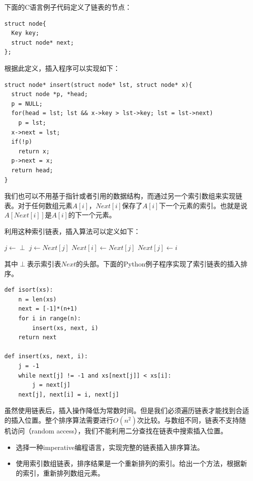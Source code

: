 \documentclass[UTF8]{article}
\begin{document}
下面的C语言例子代码定义了链表的节点：

\lstset{language=C}
\begin{lstlisting}
struct node{
  Key key;
  struct node* next;
};
\end{lstlisting}

根据此定义，插入程序可以实现如下：

\begin{lstlisting}
struct node* insert(struct node* lst, struct node* x){
  struct node *p, *head;
  p = NULL;
  for(head = lst; lst && x->key > lst->key; lst = lst->next)
    p = lst;
  x->next = lst;
  if(!p)
    return x;
  p->next = x;
  return head;
}
\end{lstlisting}

我们也可以不用基于指针或者引用的数据结构，而通过另一个索引数组来实现链表。对于任何数组元素$A[i]$，$Next[i]$保存了$A[i]$下一个元素的索引。也就是说$A[Next[i]]$是$A[i]$的下一个元素。

利用这种索引链表，插入算法可以定义如下：

\begin{algorithmic}
  \State $j \gets \perp$
    \State $j \gets Next[j]$
  \EndWhile
  \State $Next[i] \gets Next[j]$
  \State $Next[j] \gets i$
\EndFunction
\end{algorithmic}

其中$\perp$表示索引表$Next$的头部。下面的Python例子程序实现了索引链表的插入排序。

\lstset{language=Python}
\begin{lstlisting}
def isort(xs):
    n = len(xs)
    next = [-1]*(n+1)
    for i in range(n):
        insert(xs, next, i)
    return next

def insert(xs, next, i):
    j = -1
    while next[j] != -1 and xs[next[j]] < xs[i]:
        j = next[j]
    next[j], next[i] = i, next[j]
\end{lstlisting}

虽然使用链表后，插入操作降低为常数时间。但是我们必须遍历链表才能找到合适的插入位置。整个排序算法需要进行$O(n^2)$次比较。与数组不同，链表不支持随机访问（random access），我们不能利用二分查找在链表中搜索插入位置。

\begin{Exercise}
\begin{itemize}
\item 选择一种imperative编程语言，实现完整的链表插入排序算法。
\item 使用索引数组链表，排序结果是一个重新排列的索引。给出一个方法，根据新的索引，重新排列数组元素。
\end{itemize}
\end{Exercise}
\end{document}
